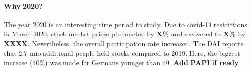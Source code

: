 \documentclass[ProjectABM]{subfiles}
\begin{document}




\paragraph{Why 2020?}
The year 2020 is an interesting time period to study. Due to covid-19 restrictions in March 2020, stock market prices plummeted by \textbf{X\%} and recovered to \textbf{X\%} by \textbf{XXXX}. Nevertheless, the overall participation rate increased. The DAI reports that 2.7 mio additional people held stocks compared to 2019. Here, the biggest increase (40\%) was made for Germans younger than 40. \textbf{Add PAPI if ready}
\end{document}
